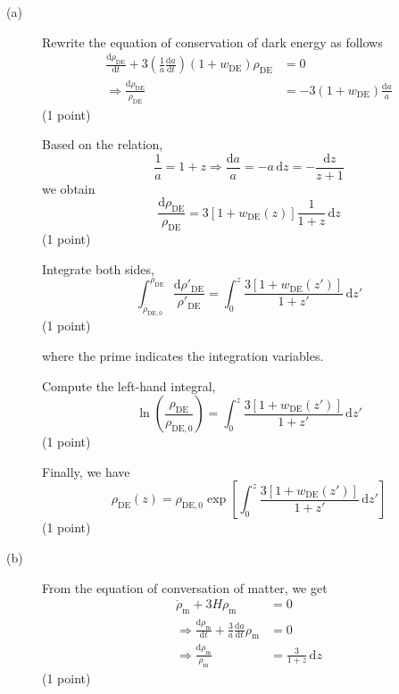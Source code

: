 \begin{description}
\item[(a)] Rewrite the equation of conservation of dark energy as follows
  \begin{align*}
    \frac{\mathrm{d}\rho_{\mathrm{DE}}}{\mathrm{d}t}
      + 3\left(\frac{1}{a}\frac{\mathrm{d}a}{\mathrm{d}t}\right)
        (1 + w_{\mathrm{DE}})\rho_{\mathrm{DE}} &= 0 \\
    \Rightarrow \frac{\mathrm{d}\rho_{\mathrm{DE}}}{\rho_{\mathrm{DE}}}
      &= -3(1 + w_{\mathrm{DE}})\frac{\mathrm{d}a}{a}
  \end{align*}
  \hfill(1 point)

  Based on the relation,
  \[ \frac{1}{a} = 1 + z \Rightarrow \frac{\mathrm{d}a}{a} = -a\,\mathrm{d}z
     = -\frac{\mathrm{d}z}{z+1} \]
  we obtain
  \[ \frac{\mathrm{d}\rho_{\mathrm{DE}}}{\rho_{\mathrm{DE}}}
     = 3\left[1 + w_{\mathrm{DE}}(z)\right]\frac{1}{1+z}\,\mathrm{d}z \]
  \hfill(1 point)

  Integrate both sides,
  \[ \int_{\rho_{\mathrm{DE},0}}^{\rho_{\mathrm{DE}}}
     \frac{\mathrm{d}\rho'_{\mathrm{DE}}}{\rho'_{\mathrm{DE}}}
     = \int_0^z \frac{3\left[1 + w_{\mathrm{DE}}(z')\right]}{1+z'}\,\mathrm{d}z' \]
  \hfill(1 point)

  where the prime indicates the integration variables.

  Compute the left-hand integral,
  \[ \ln\left(\frac{\rho_{\mathrm{DE}}}{\rho_{\mathrm{DE},0}}\right)
     = \int_0^z \frac{3\left[1 + w_{\mathrm{DE}}(z')\right]}{1+z'}\,\mathrm{d}z' \]
  \hfill(1 point)

  Finally, we have
  \[ \rho_{\mathrm{DE}}(z) = \rho_{\mathrm{DE},0}
     \exp\left[\int_0^z \frac{3\left[1 + w_{\mathrm{DE}}(z')\right]}{1+z'}
     \,\mathrm{d}z'\right] \]
  \hfill(1 point)

\item[(b)] From the equation of conversation of matter, we get
  \begin{align*}
    \dot{\rho}_{\mathrm{m}} + 3H\rho_{\mathrm{m}} &= 0 \\
    \Rightarrow \frac{\mathrm{d}\rho_{\mathrm{m}}}{\mathrm{d}t}
      + \frac{3}{a}\frac{\mathrm{d}a}{\mathrm{d}t}\rho_{\mathrm{m}} &= 0 \\
    \Rightarrow \frac{\mathrm{d}\rho_{\mathrm{m}}}{\rho_{\mathrm{m}}}
      &= \frac{3}{1+z}\,\mathrm{d}z
  \end{align*}
  \hfill(1 point)


\end{description}
